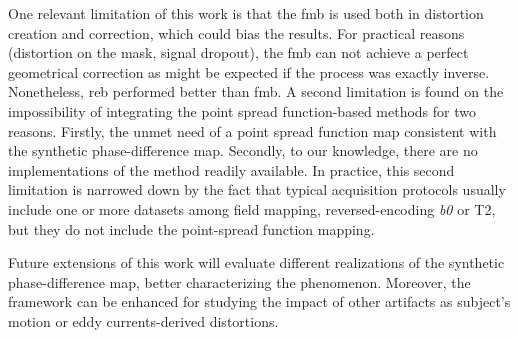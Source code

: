 One relevant limitation of this work is that the \gls*{fmb} is
used both in distortion creation and correction, which could
bias the results. For practical reasons (distortion on the mask, 
signal dropout), the \gls*{fmb} can not achieve a perfect 
geometrical correction as might be
expected if the process was exactly inverse.
Nonetheless, \gls*{reb} performed better than \gls*{fmb}.
A second limitation is found on the impossibility of integrating the
point spread function-based methods for two reasons.
Firstly, the unmet need of a point spread function map consistent
with the synthetic phase-difference map. Secondly, to our knowledge,
there are no implementations of the method readily available.
In practice, this second limitation is narrowed down by the
fact that typical acquisition protocols usually include one or more
datasets among field mapping, reversed-encoding \textit{b0} or T2,
but they do not include the point-spread function mapping.

Future extensions of this work will evaluate
different realizations of the synthetic phase-difference map,
better characterizing the phenomenon. Moreover, the
framework can be enhanced for studying the impact of 
other artifacts as subject's motion or eddy 
currents-derived distortions.